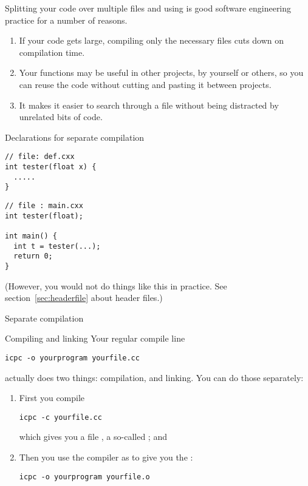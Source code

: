 Splitting your code over multiple
files and using
is good software engineering practice for a number of
reasons. 
\begin{enumerate}
\item If your code gets large, compiling only the necessary files cuts
  down on compilation time.
\item Your functions may be useful in other projects, by yourself or
  others, so you can reuse the code without cutting and pasting it
  between projects.
\item It makes it easier to search through a file without being
  distracted by unrelated bits of code.
\end{enumerate}

\begin{slide}{Declarations for separate compilation}
\label{sl:separate-proto}
\begin{multicols}{2}  
\begin{lstlisting}
// file: def.cxx
int tester(float x) {
  .....
}
\end{lstlisting}
\vfill\columnbreak
\begin{lstlisting}
// file : main.cxx
int tester(float);

int main() {
  int t = tester(...);
  return 0;
}
\end{lstlisting}
\end{multicols}
\end{slide}

(However, you would not do things like this in practice. See 
section~\ref{sec:headerfile} about header files.)

 {Separate compilation}

\begin{block}{Compiling and linking}
  \label{sl:compile-link}
  Your regular compile line
\begin{verbatim}
icpc -o yourprogram yourfile.cc
\end{verbatim}
  actually does two things: compilation, and linking. You can do those
  separately:
  \begin{enumerate}
  \item First you compile
\begin{verbatim}
icpc -c yourfile.cc
\end{verbatim}
  which gives you a file , a so-called
  ; and
  \item Then you use the compiler as  to give you
    the :
\begin{verbatim}
icpc -o yourprogram yourfile.o
\end{verbatim}
  \end{enumerate}
\end{block}

